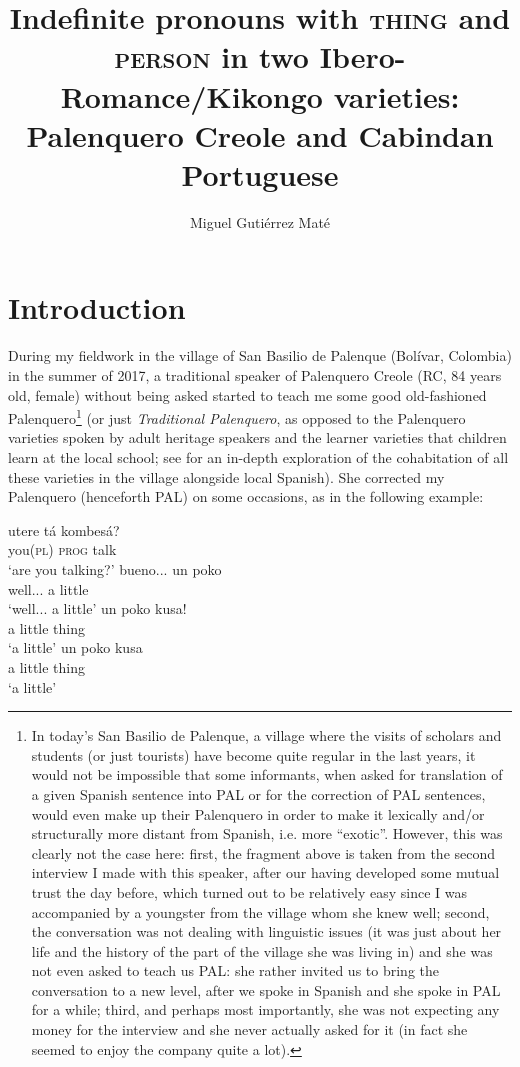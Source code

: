 \documentclass[output=paper,colorlinks,citecolor=brown]{langscibook}
\author{Miguel Gutiérrez Maté\orcid{}\affiliation{University of Augsburg}}
\title[Indefinite pronouns with \textsc{thing} and \textsc{person}]{Indefinite pronouns with \textsc{thing} and \textsc{person} in two Ibero\hyp Romance\slash Kikongo varieties: Palenquero Creole and Cabindan Portuguese}
\begin{document}
\maketitle

\section{Introduction}
During my fieldwork in the village of San Basilio de Palenque (Bolívar, Colombia) in the summer of 2017, a traditional speaker of Palenquero Creole (RC, 84 years old, female) without being asked started to teach me some good old-fashioned Palenquero\footnote{In today’s San Basilio de Palenque, a village where the visits of scholars and students (or just tourists) have become quite regular in the last years, it would not be impossible that some informants, when asked for translation of a given Spanish sentence into PAL or for the correction of PAL sentences, would even make up their Palenquero in order to make it lexically and/or structurally more distant from Spanish, i.e. more “exotic”. However, this was clearly not the case here: first, the fragment above is taken from the second interview I made with this speaker, after our having developed some mutual trust the day before, which turned out to be relatively easy since I was accompanied by a youngster from the village whom she knew well; second, the conversation was not dealing with linguistic issues (it was just about her life and the history of the part of the village she was living in) and she was not even asked to teach us PAL: she rather invited us to bring the conversation to a new level, after we spoke in Spanish and she spoke in PAL for a while; third, and perhaps most importantly, she was not expecting any money for the interview and she never actually asked for it (in fact she seemed to enjoy the company quite a lot).} (or just \textit{Traditional Palenquero}, as opposed to the Palenquero varieties spoken by adult heritage speakers and the learner varieties that children learn at the local school; see \cite{Lipski2020} for an in-depth exploration of the cohabitation of all these varieties in the village alongside local Spanish). She corrected my Palenquero (henceforth PAL) on some occasions, as in the following example:

\begin{exe}
    \gll    utere tá kombesá?\\
            you(\textsc{pl}) \textsc{prog} talk\\
    \glt    ‘are you talking?’
    \gll    bueno... un poko\\
            well... a little\\
    \glt    ‘well... a little’
    \gll    un poko kusa!\\
            a little thing\\
    \glt    ‘a little’
    \gll    un poko kusa\\
            a little thing\\
    \glt    ‘a little’
\end{exe}
\end{document}
